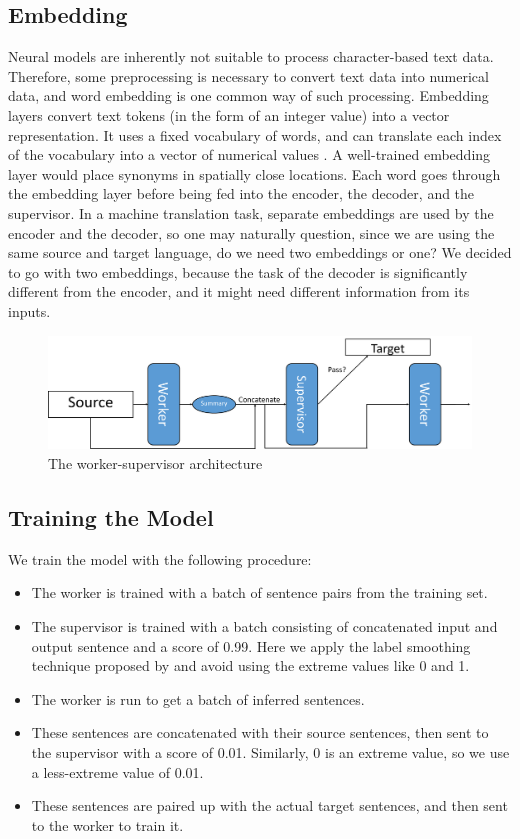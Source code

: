 \documentclass[letterpaper]{article} %
\begin{document}
\subsection{Embedding}
Neural models are inherently not suitable to process character-based text data. Therefore, some preprocessing is necessary to convert text data into numerical data, and word embedding is one common way of such processing. Embedding layers convert text tokens (in the form of an integer value) into a vector representation. It uses a fixed vocabulary of words, and can translate each index of the vocabulary into a vector of numerical values \cite{bengio2003neural}. A well-trained embedding layer would place synonyms in spatially close locations. Each word goes through the embedding layer before being fed into the encoder, the decoder, and the supervisor. In a machine translation task, separate embeddings are used by the encoder and the decoder, so one may naturally question, since we are using the same source and target language, do we need two embeddings or one? We decided to go with two embeddings, because the task of the decoder is significantly different from the encoder, and it might need different information from its inputs.

\begin{figure}[h]
	\includegraphics[scale=0.25]{architecture}
	\centering
	\caption{The worker-supervisor architecture}
\end{figure}

\subsection{Training the Model}
We train the model with the following procedure:
\begin{itemize}
	\item The worker is trained with a batch of sentence pairs from the training set.
	\item The supervisor is trained with a batch consisting of concatenated input and output sentence and a score of 0.99. Here we apply the label smoothing technique proposed by \cite{salimans2016improved} and avoid using the extreme values like 0 and 1.
	\item The worker is run to get a batch of inferred sentences.
	\item These sentences are concatenated with their source sentences, then sent to the supervisor with a score of 0.01. Similarly, 0 is an extreme value, so we use a less-extreme value of 0.01.
	\item These sentences are paired up with the actual target sentences, and then sent to the worker to train it.
\end{itemize}
\end{document}
